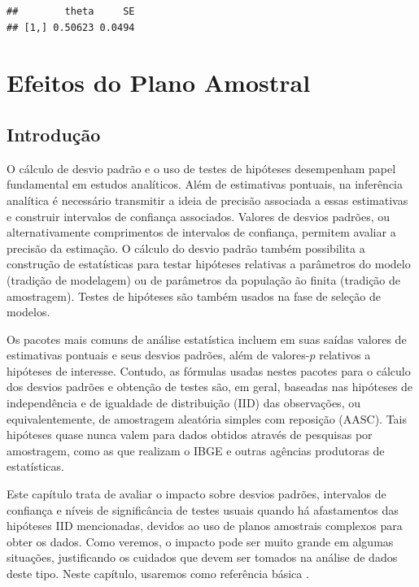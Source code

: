 \documentclass[]{book}
\numberwithin{example}{chapter}
\numberwithin{remark}{chapter}
\numberwithin{definition}{chapter}
\begin{document}
\begin{verbatim}
##        theta     SE
## [1,] 0.50623 0.0494
\end{verbatim}

\chapter{Efeitos do Plano Amostral}\label{epa}

\section{Introdução}\label{introducao}

O cálculo de desvio padrão e o uso de testes de hipóteses desempenham
papel fundamental em estudos analíticos. Além de estimativas pontuais,
na inferência analítica é necessário transmitir a ideia de precisão
associada a essas estimativas e construir intervalos de confiança
associados. Valores de desvios padrões, ou alternativamente comprimentos
de intervalos de confiança, permitem avaliar a precisão da estimação. O
cálculo do desvio padrão também possibilita a construção de estatísticas
para testar hipóteses relativas a parâmetros do modelo (tradição de
modelagem) ou de parâmetros da população ão finita (tradição de
amostragem). Testes de hipóteses são também usados na fase de seleção de
modelos.

Os pacotes mais comuns de análise estatística incluem em suas saídas
valores de estimativas pontuais e seus desvios padrões, além de
valores-\(p\) relativos a hipóteses de interesse. Contudo, as fórmulas
usadas nestes pacotes para o cálculo dos desvios padrões e obtenção de
testes são, em geral, baseadas nas hipóteses de independência e de
igualdade de distribuição (IID) das observações, ou equivalentemente, de
amostragem aleatória simples com reposição (AASC). Tais hipóteses quase
nunca valem para dados obtidos através de pesquisas por amostragem, como
as que realizam o IBGE e outras agências produtoras de estatísticas.

Este capítulo trata de avaliar o impacto sobre desvios padrões,
intervalos de confiança e níveis de significância de testes usuais
quando há afastamentos das hipóteses IID mencionadas, devidos ao uso de
planos amostrais complexos para obter os dados. Como veremos, o impacto
pode ser muito grande em algumas situações, justificando os cuidados que
devem ser tomados na análise de dados deste tipo. Neste capítulo,
usaremos como referência básica \citep{Sk89a}.
\end{document}
